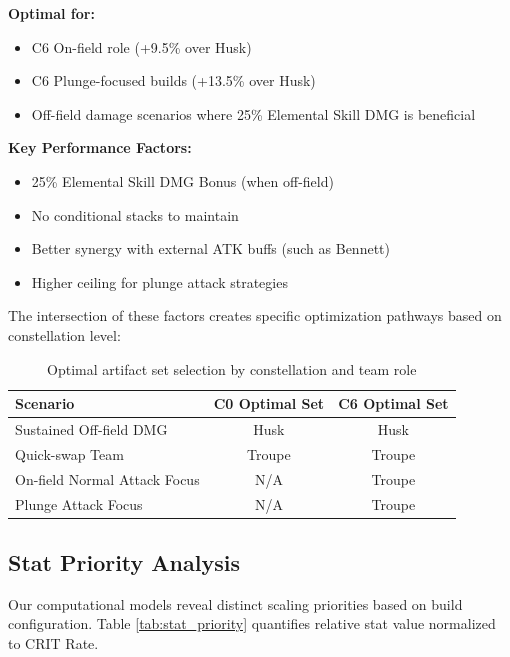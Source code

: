 \documentclass[12pt,a4paper]{article}
\begin{document}
\begin{tcolorbox}[colback=troupecolor!5, colframe=troupecolor, title=Golden Troupe (4pc)]
\textbf{Optimal for:}
\begin{itemize}
    \item C6 On-field role (+9.5\% over Husk)
    \item C6 Plunge-focused builds (+13.5\% over Husk)
    \item Off-field damage scenarios where 25\% Elemental Skill DMG is beneficial
\end{itemize}

\textbf{Key Performance Factors:}
\begin{itemize}
    \item 25\% Elemental Skill DMG Bonus (when off-field)
    \item No conditional stacks to maintain
    \item Better synergy with external ATK buffs (such as Bennett)
    \item Higher ceiling for plunge attack strategies
\end{itemize}
\end{tcolorbox}

The intersection of these factors creates specific optimization pathways based on constellation level:

\begin{table}[h]
\centering
\begin{tabular}{lcc}
\toprule
\textbf{Scenario} & \textbf{C0 Optimal Set} & \textbf{C6 Optimal Set} \\
\midrule
Sustained Off-field DMG & Husk & Husk \\
Quick-swap Team & Troupe & Troupe \\
On-field Normal Attack Focus & N/A & Troupe \\
Plunge Attack Focus & N/A & Troupe \\
\bottomrule
\end{tabular}
\caption{Optimal artifact set selection by constellation and team role}
\label{tab:artifact_selection}
\end{table}

\subsection{Stat Priority Analysis}

Our computational models reveal distinct scaling priorities based on build configuration. Table \ref{tab:stat_priority} quantifies relative stat value normalized to CRIT Rate.
\end{document}

